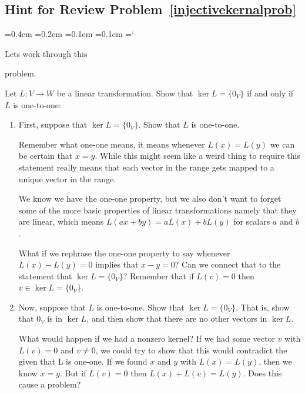
\subsection*{Hint for Review Problem~\ref{injectivekernalprob} }

{\ttfamily
{}\font=0.4em
\font=0.2em
\font=0.1em
\font=0.1em
\hyphenchar\font=`\-


\hypertarget{scripts_kernel_range_nullity_rank_hint}{Lets work through this} problem. 

Let $L \colon V\rightarrow W$ be a linear transformation.  Show that $\ker L=\{0_V\}$ if and only if $L$ is one-to-one:
\begin{enumerate}
\item First, suppose that \(\ker L=\{0_V\}\). Show that \(L\) is one-to-one. 

Remember what one-one means, it means whenever $L(x) = L(y)$ we can be certain that $x=y$. While this might seem like a weird thing to require this statement really means that each vector in the range gets mapped to a unique vector in the range. 

We know we have the one-one property, but we also don't want to forget some of the more basic properties of linear transformations namely that they are linear, which means $L(ax+by) = aL(x) + bL(y)$ for scalars $a$ and $b$. 

What if we rephrase the one-one property to say whenever $L(x) -L(y) = 0$ implies that $x-y = 0$? Can we connect that to the statement that $\ker L=\{0_V\}$? Remember that if $L(v) = 0 $ then $v \in \ker L=\{0_V\}$.

\item Now, suppose that \(L\) is one-to-one. Show that \(\ker L=\{0_V\}\). That is, show that \(0_V\) is in \(\ker L\), and then show that there are no other vectors in \(\ker L\).

What would happen if we had a nonzero kernel? If we had some vector $v$ with $L(v) = 0 $ and $v \not = 0 $, we could try to show that this would contradict the given that L is one-one. If we found $x$ and $y$ with $L(x) = L(y)$, then we know $x=y$. But if $L(v) = 0 $ then $L(x) + L(v) = L(y)$. Does this cause a problem?

\end{enumerate}




} %

